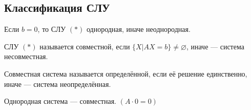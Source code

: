 \subsection*{Классификация СЛУ}

\begin{conj}
    Если $b = 0$, то СЛУ $(*)$ однородная, иначе неоднородная.
\end{conj}

\begin{conj}
    СЛУ $(*)$ называется совместной, если $\{ X | AX = b \} \neq \varnothing$,
    иначе --- система несовместная.
\end{conj}

\begin{conj}
    Совместная система называется определённой, если её решение единственно,
    иначе --- система неопределённая.
\end{conj}

\notice Однородная система --- совместная. $(A \cdot 0 = 0)$

